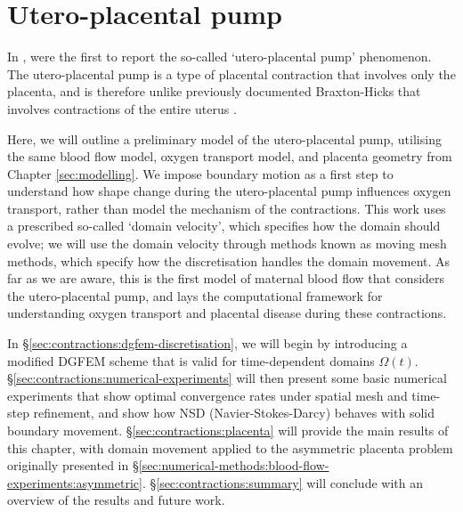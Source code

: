 \chapter{Utero-placental pump} \label{sec:contractions}

    In \citeyear{dellschaftHaemodynamicsHumanPlacenta2020}, \citeauthor{dellschaftHaemodynamicsHumanPlacenta2020} \cite{dellschaftHaemodynamicsHumanPlacenta2020} were the first to report the so-called `utero-placental pump' phenomenon. The utero-placental pump is a type of placental contraction that involves only the placenta, and is therefore unlike previously documented Braxton-Hicks that involves contractions of the entire uterus \cite{togashiSustainedUterineContractions1993}.

    Here, we will outline a preliminary model of the utero-placental pump, utilising the same blood flow model, oxygen transport model, and placenta geometry from Chapter \ref{sec:modelling}. We impose boundary motion as a first step to understand how shape change during the utero-placental pump influences oxygen transport, rather than model the mechanism of the contractions. This work uses a prescribed so-called `domain velocity', which specifies how the domain should evolve; we will use the domain velocity through methods known as moving mesh methods, which specify how the discretisation handles the domain movement. As far as we are aware, this is the first model of maternal blood flow that considers the utero-placental pump, and lays the computational framework for understanding oxygen transport and placental disease during these contractions.
    
    In \S\ref{sec:contractions:dgfem-discretisation}, we will begin by introducing a modified DGFEM scheme that is valid for time-dependent domains $\Omega(t)$. \S\ref{sec:contractions:numerical-experiments} will then present some basic numerical experiments that show optimal convergence rates under spatial mesh and time-step refinement, and show how NSD (Navier-Stokes-Darcy) behaves with solid boundary movement. \S\ref{sec:contractions:placenta} will provide the main results of this chapter, with domain movement applied to the asymmetric placenta problem originally presented in \S\ref{sec:numerical-methods:blood-flow-experiments:asymmetric}. \S\ref{sec:contractions:summary} will conclude with an overview of the results and future work.

